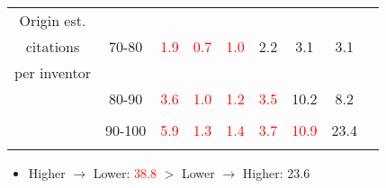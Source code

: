 \documentclass{beamer}
\begin{document}
{\begin{table}[t]
\begin{center}
\begin{tabular}{ccccccccc
        }
        Origin est.                                              &                                                            &                      &                      &                      &                      &                       &          \\
        citations                                                & 70-80                                                      & \textcolor{red}{1.9} & \textcolor{red}{0.7} & \textcolor{red}{1.0} & 2.2                  & 3.1                   & 3.1      \\
        per inventor                                             &                                                            &                      &                      &                      &                      &                       &          \\
                                                                 & 80-90                                                      & \textcolor{red}{3.6} & \textcolor{red}{1.0} & \textcolor{red}{1.2} & \textcolor{red}{3.5} & 10.2                  & 8.2      \\
                                                                 &                                                            &                      &                      &                      &                      &                       &          \\
                                                                 & 90-100                                                     & \textcolor{red}{5.9} & \textcolor{red}{1.3} & \textcolor{red}{1.4} & \textcolor{red}{3.7} & \textcolor{red}{10.9} & 23.4     \\
        \\\hline
      \end{tabular}
    \end{center}
  \end{table}
  \begin{itemize}
    \item Higher $\rightarrow$ Lower: \textcolor{red}{38.8} $>$ Lower $\rightarrow$ Higher: 23.6
  \end{itemize}
}
\end{document}
